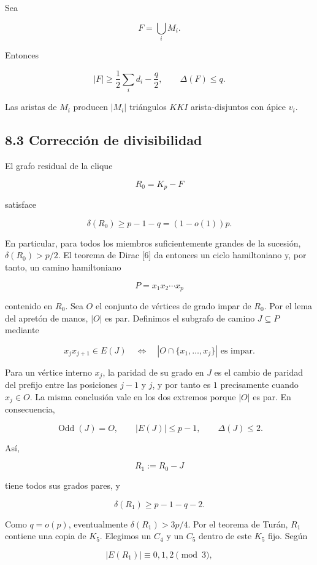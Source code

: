\documentclass[
  11pt,
]{article}
\begin{document}
Sea

\[
F=\bigcup_iM_i.
\]

Entonces

\[
|F|
\ge
\frac12\sum_i d_i-\frac q2,
\qquad
\Delta(F)\le q.
\tag{8.3}
\]

Las aristas de \(M_i\) producen \(|M_i|\) triángulos \(KKI\)
arista-disjuntos con ápice \(v_i\).

\subsection{8.3 Corrección de
divisibilidad}\label{correcciuxf3n-de-divisibilidad}

El grafo residual de la clique

\[
R_0=K_p-F
\]

satisface

\[
\delta(R_0)
\ge
p-1-q
=(1-o(1))p.
\tag{8.4}
\]

En particular, para todos los miembros suficientemente grandes de la
sucesión, \(\delta(R_0)>p/2\). El teorema de Dirac {[}6{]} da entonces
un ciclo hamiltoniano y, por tanto, un camino hamiltoniano

\[
P=x_1x_2\cdots x_p
\]

contenido en \(R_0\). Sea \(O\) el conjunto de vértices de grado impar
de \(R_0\). Por el lema del apretón de manos, \(|O|\) es par. Definimos
el subgrafo de camino \(J\subseteq P\) mediante

\[
x_jx_{j+1}\in E(J)
\quad\Longleftrightarrow\quad
|O\cap\{x_1,\ldots,x_j\}|\text{ es impar}.
\tag{8.5}
\]

Para un vértice interno \(x_j\), la paridad de su grado en \(J\) es el
cambio de paridad del prefijo entre las posiciones \(j-1\) y \(j\), y
por tanto es \(1\) precisamente cuando \(x_j\in O\). La misma conclusión
vale en los dos extremos porque \(|O|\) es par. En consecuencia,

\[
\operatorname{Odd}(J)=O,
\qquad
|E(J)|\le p-1,
\qquad
\Delta(J)\le2.
\tag{8.6}
\]

Así,

\[
R_1:=R_0-J
\]

tiene todos sus grados pares, y

\[
\delta(R_1)\ge p-1-q-2.
\tag{8.7}
\]

Como \(q=o(p)\), eventualmente \(\delta(R_1)>3p/4\). Por el teorema de
Turán, \(R_1\) contiene una copia de \(K_5\). Elegimos un \(C_4\) y un
\(C_5\) dentro de este \(K_5\) fijo. Según

\[
|E(R_1)|\equiv0,1,2\pmod3,
\]
\end{document}
